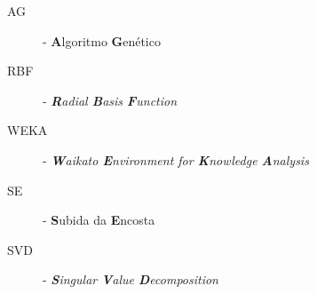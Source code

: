 
\begin{description}
 \item[AG] - \textbf{A}lgoritmo \textbf{G}enético
 \item[RBF] - \textit{\textbf{R}adial \textbf{B}asis \textbf{F}unction}
 \item[WEKA] - \textit{\textbf{W}aikato \textbf{E}nvironment for \textbf{K}nowledge \textbf{A}nalysis}
 \item[SE] - \textbf{S}ubida da \textbf{E}ncosta
 \item[SVD] - \textit{\textbf{S}ingular \textbf{V}alue \textbf{D}ecomposition}
\end{description}
